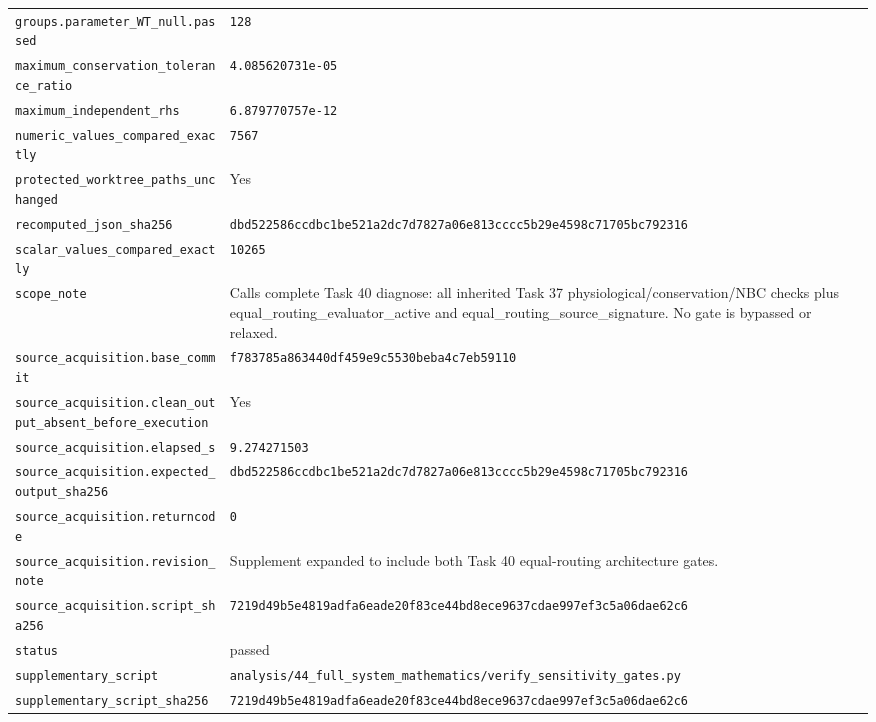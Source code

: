\begin{longtable}{p{.46\linewidth}p{.46\linewidth}}
\nolinkurl{groups.parameter_WT_null.passed} & \texttt{128} \\
\nolinkurl{maximum_conservation_tolerance_ratio} & \texttt{4.085620731e-05} \\
\nolinkurl{maximum_independent_rhs} & \texttt{6.879770757e-12} \\
\nolinkurl{numeric_values_compared_exactly} & \texttt{7567} \\
\nolinkurl{protected_worktree_paths_unchanged} & Yes \\
\nolinkurl{recomputed_json_sha256} & \nolinkurl{dbd522586ccdbc1be521a2dc7d7827a06e813cccc5b29e4598c71705bc792316} \\
\nolinkurl{scalar_values_compared_exactly} & \texttt{10265} \\
\nolinkurl{scope_note} & Calls complete Task 40 diagnose: all inherited Task 37 physiological/conservation/NBC checks plus equal\_routing\_evaluator\_active and equal\_routing\_source\_signature. No gate is bypassed or relaxed. \\
\nolinkurl{source_acquisition.base_commit} & \nolinkurl{f783785a863440df459e9c5530beba4c7eb59110} \\
\nolinkurl{source_acquisition.clean_output_absent_before_execution} & Yes \\
\nolinkurl{source_acquisition.elapsed_s} & \texttt{9.274271503} \\
\nolinkurl{source_acquisition.expected_output_sha256} & \nolinkurl{dbd522586ccdbc1be521a2dc7d7827a06e813cccc5b29e4598c71705bc792316} \\
\nolinkurl{source_acquisition.returncode} & \texttt{0} \\
\nolinkurl{source_acquisition.revision_note} & Supplement expanded to include both Task 40 equal-routing architecture gates. \\
\nolinkurl{source_acquisition.script_sha256} & \nolinkurl{7219d49b5e4819adfa6eade20f83ce44bd8ece9637cdae997ef3c5a06dae62c6} \\
\nolinkurl{status} & passed \\
\nolinkurl{supplementary_script} & \nolinkurl{analysis/44_full_system_mathematics/verify_sensitivity_gates.py} \\
\nolinkurl{supplementary_script_sha256} & \nolinkurl{7219d49b5e4819adfa6eade20f83ce44bd8ece9637cdae997ef3c5a06dae62c6} \\
\end{longtable}
\endgroup



